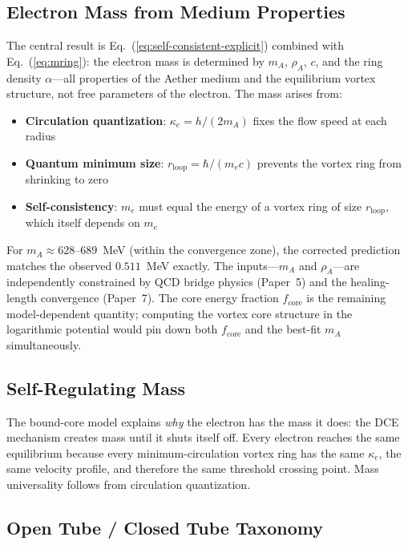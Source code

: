 \documentclass[12pt,letterpaper]{article}
\newcommand{\rhoa}{\rho_{\!A}}
\newcommand{\rloop}{r_{\mathrm{loop}}}
\begin{document}
\subsection{Electron Mass from Medium Properties}

The central result is Eq.~(\ref{eq:self-consistent-explicit}) combined with
Eq.~(\ref{eq:mring}): the electron mass is determined by $m_A$, $\rhoa$,
$c$, and the ring density $\alpha$---all properties of the Aether medium and
the equilibrium vortex structure, not free parameters of the electron.  The
mass arises from:

\begin{itemize}[leftmargin=2em]
  \item \textbf{Circulation quantization}: $\kappa_e = h/(2m_A)$ fixes the
    flow speed at each radius
  \item \textbf{Quantum minimum size}: $\rloop = \hbar/(m_e c)$ prevents the
    vortex ring from shrinking to zero
  \item \textbf{Self-consistency}: $m_e$ must equal the energy of a vortex
    ring of size $\rloop$, which itself depends on $m_e$
\end{itemize}

For $m_A \approx 628$--$689$~MeV (within the convergence zone), the
corrected prediction matches the observed $0.511$~MeV exactly.  The
inputs---$m_A$ and $\rhoa$---are independently constrained by QCD bridge
physics (Paper~5) and the healing-length convergence (Paper~7).  The core
energy fraction $f_{\mathrm{core}}$ is the remaining model-dependent
quantity; computing the vortex core structure in the logarithmic potential
would pin down both $f_{\mathrm{core}}$ and the best-fit $m_A$
simultaneously.

\subsection{Self-Regulating Mass}

The bound-core model explains \emph{why} the electron has the mass it does:
the DCE mechanism creates mass until it shuts itself off.  Every electron
reaches the same equilibrium because every minimum-circulation vortex ring
has the same $\kappa_e$, the same velocity profile, and therefore the same
threshold crossing point.  Mass universality follows from circulation
quantization.

\subsection{Open Tube / Closed Tube Taxonomy}
\end{document}
